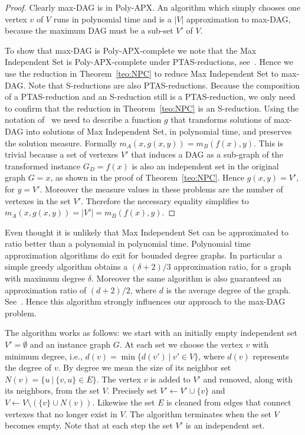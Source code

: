 \documentclass[a4paper]{article}
\begin{document}
\begin{proof}
  Clearly max-DAG is in Poly-APX. An algorithm which simply chooses one
  vertex $v$ of $V$ runs in polynomial time and is a $|V|$ approximation
  to max-DAG, because the maximum DAG must be a sub-set $V'$ of $V$.

  To show that max-DAG is Poly-APX-complete we note that the Max
  Independent Set is Poly-APX-complete under PTAS-reductions,
  see~\citet*{Bazgan_2005}. Hence we use the reduction in
  Theorem~\ref{teo:NPC} to reduce Max Independent Set to max-DAG. Note that
  S-reductions are also PTAS-reductions. Because the composition of a
  PTAS-reduction and an S-reduction still is a PTAS-reduction, we only need
  to confirm that the reduction in Theorem~\ref{teo:NPC} is an S-reduction.
  Using the notation of~\citet{Crescenzi} we need to describe a function
  $g$ that transforms solutions of max-DAG into solutions of Max
  Independent Set, in polynomial time, and preserves the solution
  measure. Formally $m_A(x, g(x,y)) = m_B(f(x),y)$. This is trivial because
  a set of vertexes $V'$ that induces a DAG as a sub-graph of the
  transformed instance $G_D = f(x)$ is also an independent set in the
  original graph $G=x$, as shown in the proof of
  Theorem~\ref{teo:NPC}. Hence $g(x,y) = V'$, for $y = V'$. Moreover the
  measure values in these problems are the number of vertexes in the set
  $V'$. Therefore the necessary equality simplifies to
  $m_A(x,g(x,y)) = |V'| = m_B(f(x),y)$.
\end{proof}
%
Even thought it is unlikely that Max Independent Set can be approximated to
ratio better than a polynomial in polynomial time. Polynomial time
approximation algorithms do exit for bounded degree graphs. In particular a
simple greedy algorithm obtains a $(\delta + 2)/3$ approximation ratio, for
a graph with maximum degree $\delta$. Moreover the same algorithm is also
guaranteed an approximation ratio of $(d+2)/2$, where $d$ is the average
degree of the graph. See~\citet*{Halld_rsson_1997}. Hence this algorithm
strongly influences our approach to the max-DAG problem.

The algorithm works as follows: we start with an initially empty
independent set $V' = \emptyset$ and an instance graph $G$. At each set we
choose the vertex $v$ with minimum degree, i.e.,
$d(v) = \min\{d(v')\ |\ v' \in V\}$, where $d(v)$ represents the degree of
$v$. By degree we mean the size of its neighbor set
$N(v) = \{u\ |\ \{v, u\} \in E\}$. The vertex $v$ is added to $V'$ and
removed, along with its neighbors, from the set $V$. Precisely set
$V' \leftarrow V' \cup \{v\}$ and
$V \leftarrow V \setminus (\{v\} \cup N(v))$. Likewise the set $E$ is
cleaned from edges that connect vertexes that no longer exist in $V$. The
algorithm terminates when the set $V$ becomes empty. Note that at each step
the set $V'$ is an independent set.
\end{document}
